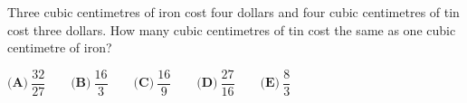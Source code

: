 Three cubic centimetres of iron cost four dollars and four cubic centimetres of tin cost three dollars. How many cubic centimetres of tin cost the same as one cubic centimetre of iron?

$\textbf{(A)}\ \dfrac{32}{27}\qquad\textbf{(B)}\ \dfrac{16}{3}\qquad\textbf{(C)}\ \dfrac{16}{9}\qquad\textbf{(D)}\ \dfrac{27}{16} \qquad\textbf{(E)}\ \dfrac{8}{3}$
